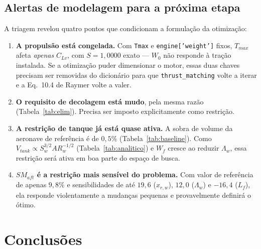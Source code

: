 \documentclass[11pt,a4paper]{article}
\newcommand{\code}[1]{\texttt{\small #1}}
\begin{document}
\subsection{Alertas de modelagem para a pr\'oxima etapa}

A triagem revelou quatro pontos que condicionam a formula\c{c}\~ao da
otimiza\c{c}\~ao:

\begin{enumerate}
\item \textbf{A propuls\~ao est\'a congelada.} Com \code{Tmax} e
\code{engine['weight']} fixos, $T_{max}$ afeta \emph{apenas} $C_{Lv}$, com
$S = 1{,}0000$ exato --- $W_0$ n\~ao responde \`a tra\c{c}\~ao instalada. Se a
otimiza\c{c}\~ao puder dimensionar o motor, essas duas chaves precisam ser
removidas do dicion\'ario para que \code{thrust\_matching} volte a iterar e a
Eq.~10.4 de Raymer volte a valer.

\item \textbf{O requisito de decolagem est\'a mudo}, pela mesma raz\~ao
(Tabela~\ref{tab:elim}). Precisa ser imposto explicitamente como
restri\c{c}\~ao.

\item \textbf{A restri\c{c}\~ao de tanque j\'a est\'a quase ativa.} A sobra de
volume da aeronave de refer\^encia \'e de $0{,}5\%$
(Tabela~\ref{tab:baseline}). Como $V_{tank} \propto S_w^{3/2} AR_w^{-1/2}$
(Tabela~\ref{tab:analitico}) e $W_f$ cresce ao reduzir $\Lambda_w$, essa
restri\c{c}\~ao ser\'a ativa em boa parte do espa\c{c}o de busca.

\item \textbf{$SM_{aft}$ \'e a restri\c{c}\~ao mais sens\'ivel do problema.} Com
valor de refer\^encia de apenas $9{,}8\%$ e sensibilidades de at\'e $19{,}6$
($x_{r,w}$), $12{,}0$ ($\Lambda_w$) e $-16{,}4$ ($L_f$), ela responde
violentamente a mudan\c{c}as pequenas e provavelmente definir\'a o \'otimo.
\end{enumerate}

\section{Conclus\~oes}
\end{document}
